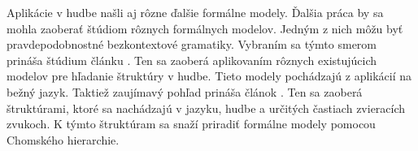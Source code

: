 Aplikácie v hudbe našli aj rôzne ďalšie formálne modely. Ďalšia práca by sa mohla zaoberať štúdiom rôznych formálnych modelov. Jedným z nich môžu byť pravdepodobnostné bezkontextové gramatiky. Vybraním sa týmto smerom prináša štúdium článku \cite{gil:2022:Citace}. Ten sa zaoberá aplikovaním rôznych existujúcich modelov pre hľadanie štruktúry v hudbe. Tieto modely pochádzajú z aplikácií na bežný jazyk.  
Taktiež zaujímavý pohľad prináša článok \cite{wilanimal:2022:Citace}. Ten sa zaoberá štruktúrami, ktoré sa nachádzajú v jazyku, hudbe a určitých častiach zvieracích zvukoch. K týmto štruktúram sa snaží priradiť formálne modely pomocou Chomského hierarchie.